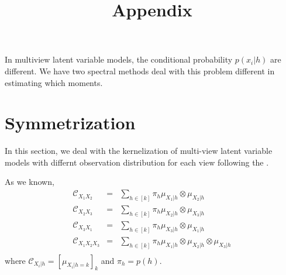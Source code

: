 \documentclass[11pt]{article}
\title{Appendix}
\begin{document}
\maketitle








In multiview latent variable models, the conditional probability $p(x_i|h)$ are different. We have two spectral methods deal with this problem different in estimating which moments.

\section{Symmetrization}
In this section, we deal with the kernelization of multi-view latent variable models with differnt observation distribution for each view following the \cite{Anima12}.

As we known,
%
\begin{eqnarray*}
{\mathcal{C}}_{X_1X_2} &=& \sum_{h \in [k]} \pi_h \mu_{X_1|h}\otimes \mu_{X_2|h}\\
{\mathcal{C}}_{X_2X_3} &=& \sum_{h \in [k]} \pi_h \mu_{X_2|h}\otimes \mu_{X_3|h}\\
{\mathcal{C}}_{X_3X_1} &=& \sum_{h \in [k]} \pi_h \mu_{X_3|h}\otimes \mu_{X_1|h}\\
{\mathcal{C}}_{X_1X_2X_3} &=& \sum_{h \in [k]} \pi_h \mu_{X_1|h}\otimes \mu_{X_2|h} \otimes \mu_{X_3|h}\\
\end{eqnarray*}
%
where ${\mathcal{C}}_{X_i|h} = [\mu_{X_i|h=k}]_k$ and $\pi_h = p(h)$.
\end{document}

